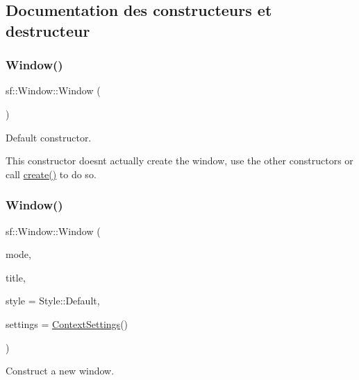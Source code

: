 \subsection{Documentation des constructeurs et destructeur}
\mbox{\label{classsf_1_1Window_a5359122166b4dc492c3d25caf08ccfc4}} 
\subsubsection{\texorpdfstring{Window()}{Window()}\hspace{0.1cm}{\footnotesize\ttfamily [1/3]}}
{\footnotesize\ttfamily sf\+::\+Window\+::\+Window (\begin{DoxyParamCaption}{ }\end{DoxyParamCaption})}



Default constructor. 

This constructor doesn\textquotesingle{}t actually create the window, use the other constructors or call \hyperlink{classsf_1_1Window_a30e6edf2162f8dbff61023b9de5d961d}{create()} to do so. \mbox{\label{classsf_1_1Window_a1bee771baecbae6d357871929dc042a2}} 
\subsubsection{\texorpdfstring{Window()}{Window()}\hspace{0.1cm}{\footnotesize\ttfamily [2/3]}}
{\footnotesize\ttfamily sf\+::\+Window\+::\+Window (\begin{DoxyParamCaption}\item[{\hyperlink{classsf_1_1VideoMode}{Video\+Mode}}]{mode,  }\item[{const \hyperlink{classsf_1_1String}{String} \&}]{title,  }\item[{Uint32}]{style = {\ttfamily Style\+:\+:Default},  }\item[{const \hyperlink{structsf_1_1ContextSettings}{Context\+Settings} \&}]{settings = {\ttfamily \hyperlink{structsf_1_1ContextSettings}{Context\+Settings}()} }\end{DoxyParamCaption})}



Construct a new window. 

